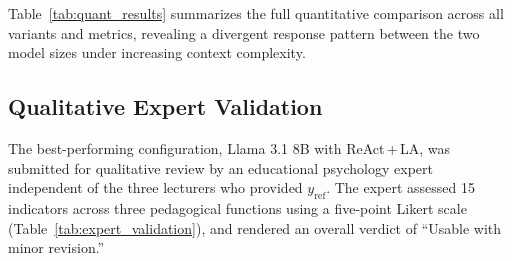 \documentclass[conference,a4paper]{IEEEtran}
\begin{document}
Table~\ref{tab:quant_results} summarizes the full
quantitative comparison across all variants and metrics,
revealing a divergent response pattern between the
two model sizes under increasing context complexity.

\subsection{Qualitative Expert Validation}

The best-performing configuration, Llama 3.1 8B
with ReAct\,+\,LA, was submitted for qualitative 
review by an educational psychology expert 
independent of the three lecturers who provided 
$y_{\text{ref}}$. The expert assessed 15
indicators across three pedagogical functions
using a five-point Likert scale
(Table~\ref{tab:expert_validation}), and rendered
an overall verdict of ``Usable with minor
revision.''


\end{document}
